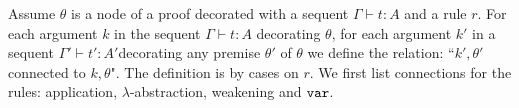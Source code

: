 %
%

%

Assume $\theta$ is a node of a proof decorated with a sequent $\Gamma \vdash t:A$
and a rule $r$. For each argument $k$ in the sequent $\Gamma \vdash t:A$ decorating
$\theta$, for each argument  $k'$ in a sequent $\Gamma' \vdash t':A'$decorating
any premise $\theta'$ of $\theta$ we define
the relation: ``$k',\theta'$ connected to $k,\theta$". The definition is by cases on $r$.
We first list connections for the rules: application, $\lambda$-abstraction, weakening and ${\tt var}$.

